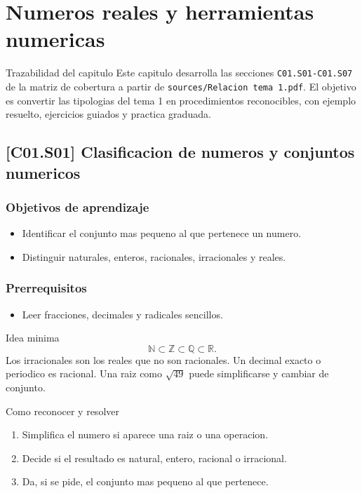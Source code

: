\chapter{Numeros reales y herramientas numericas}

\begin{theorybox}{Trazabilidad del capitulo}
Este capitulo desarrolla las secciones \texttt{C01.S01-C01.S07} de la matriz de cobertura a
partir de \texttt{sources/Relacion tema 1.pdf}. El objetivo es convertir las tipologias del
tema 1 en procedimientos reconocibles, con ejemplo resuelto, ejercicios guiados y practica
graduada.
\end{theorybox}

\section{[C01.S01] Clasificacion de numeros y conjuntos numericos}

\subsection*{Objetivos de aprendizaje}
\begin{itemize}
  \item Identificar el conjunto mas pequeno al que pertenece un numero.
  \item Distinguir naturales, enteros, racionales, irracionales y reales.
\end{itemize}

\subsection*{Prerrequisitos}
\begin{itemize}
  \item Leer fracciones, decimales y radicales sencillos.
\end{itemize}

\begin{theorybox}{Idea minima}
\[
\mathbb{N}\subset \mathbb{Z}\subset \mathbb{Q}\subset \mathbb{R}.
\]
Los irracionales son los reales que no son racionales. Un decimal exacto o periodico es
racional. Una raiz como \(\sqrt{49}\) puede simplificarse y cambiar de conjunto.
\end{theorybox}

\begin{methodbox}{Como reconocer y resolver}
\begin{enumerate}
  \item Simplifica el numero si aparece una raiz o una operacion.
  \item Decide si el resultado es natural, entero, racional o irracional.
  \item Da, si se pide, el conjunto mas pequeno al que pertenece.
\end{enumerate}
\end{methodbox}

